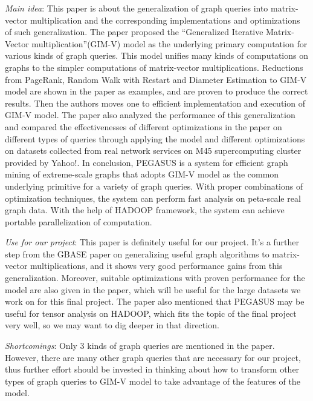 \begin{itemize*}
\item {\em Main idea}: This paper is about the generalization of graph queries into matrix-vector multiplication and the corresponding implementations and optimizations of such generalization. The paper proposed the “Generalized Iterative Matrix-Vector multiplication”(GIM-V) model as the underlying primary computation for various kinds of graph queries. This model unifies many kinds of computations on graphs to the simpler computations of matrix-vector multiplications. Reductions from PageRank, Random Walk with Restart and Diameter Estimation to GIM-V model are shown in the paper as examples, and are proven to produce the correct results. Then the authors moves one to efficient implementation and execution of GIM-V model. The paper also analyzed the performance of this generalization and compared the effectivenesses of different optimizations in the paper on different types of queries through applying the model and different optimizations on datasets collected from real network services on M45 supercomputing cluster provided by Yahoo!. In conclusion, PEGASUS is a system for efficient graph mining of extreme-scale graphs that adopts GIM-V model as the common underlying primitive for a variety of graph queries. With proper combinations of optimization techniques, the system can perform fast analysis on peta-scale real graph data. With the help of HADOOP framework, the system can achieve portable parallelization of computation.\\
\item {\em Use for our project}:
      This paper is definitely useful for our project. It’s a further step from the GBASE paper on generalizing useful graph algorithms to matrix-vector multiplications, and it shows very good performance gains from this generalization. Moreover, suitable optimizations with proven performance for the model are also given in the paper, which will be useful for the large datasets we work on for this final project. The paper also mentioned that PEGASUS may be useful for tensor analysis on HADOOP, which fits the topic of the final project very well, so we may want to dig deeper in that direction.\\
\item {\em Shortcomings}:
      Only 3 kinds of graph queries are mentioned in the paper. However, there are many other graph queries that are necessary for our project, thus further effort should be invested in thinking about how to transform other types of graph queries to GIM-V model to take advantage of the features of the model.
\end{itemize*}



